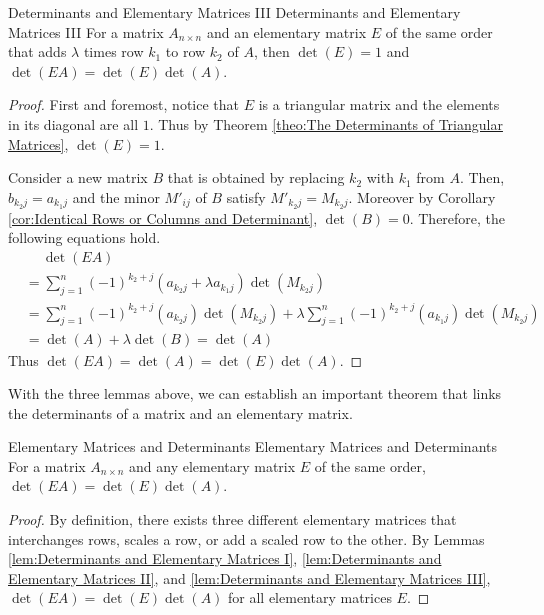 \documentclass[../main.tex]{subfiles}
\begin{document}
\begin{lemma}{Determinants and Elementary Matrices III}
{Determinants and Elementary Matrices III}
For a matrix $A_{n \times n}$ and an elementary matrix $E$ of
the same order that adds $\lambda$ times row $k_1$ to row $k_2$
of $A$, then $\det(E) = 1$ and $\det(EA) = \det(E) \det(A)$.
\end{lemma}
\begin{proof}
First and foremost, notice that $E$ is a triangular matrix and
the elements in its diagonal are all $1$. Thus by Theorem
\ref{theo:The Determinants of Triangular Matrices}, $\det(E) = 1$.

Consider a new matrix $B$ that is obtained by replacing $k_2$
with $k_1$ from $A$. Then, $b_{k_2j} = a_{k_1j}$ and the minor
$M'_{ij}$ of $B$ satisfy $M'_{k_2j} = M_{k_2j}$. Moreover by Corollary
\ref{cor:Identical Rows or Columns and Determinant}, $\det(B) = 0$.
Therefore, the following equations hold.
\begin{align*}
    &\quad\ \det(EA) \\
    &= \sum_{j=1}^n (-1)^{k_2 + j} (a_{k_2j} + \lambda a_{k_1j})
        \det(M_{k_2j}) \\
    &= \sum_{j=1}^n (-1)^{k_2 + j} (a_{k_2j}) \det(M_{k_2j}) +
        \lambda \sum_{j=1}^n (-1)^{k_2 + j} (a_{k_1j})
            \det(M_{k_2j}) \\
    &= \det(A) + \lambda \det(B)
    = \det(A)
\end{align*}
Thus $\det(EA) = \det(A) = \det(E) \det(A)$.
\end{proof}

With the three lemmas above, we can establish an important theorem
that links the determinants of a matrix and an elementary matrix.

\begin{theorem}{Elementary Matrices and Determinants}
{Elementary Matrices and Determinants}
For a matrix $A_{n \times n}$ and any elementary matrix $E$ of the
same order, $\det(EA) = \det(E) \det(A)$.
\end{theorem}
\begin{proof}
By definition, there exists three different elementary matrices that
interchanges rows, scales a row, or add a scaled row to the other.
By Lemmas \ref{lem:Determinants and Elementary Matrices I},
\ref{lem:Determinants and Elementary Matrices II}, and
\ref{lem:Determinants and Elementary Matrices III}, $\det(EA) =
\det(E) \det(A)$ for all elementary matrices $E$.
\end{proof}
\end{document}
